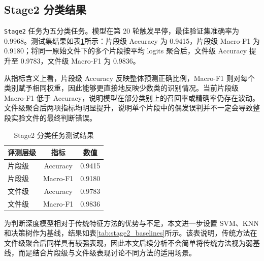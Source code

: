 \subsection{Stage2 分类结果}

\texttt{Stage2} 任务为五分类任务。模型在第 20 轮触发早停，最佳验证集准确率为 0.9968。测试集结果如表\ref{tab:stage2_results}所示：片段级 Accuracy 为 0.9415，片段级 Macro-F1 为 0.9180；将同一原始文件下的多个片段按平均 logits 聚合后，文件级 Accuracy 提升至 0.9783，文件级 Macro-F1 为 0.9836。

从指标含义上看，片段级 Accuracy 反映整体预测正确比例，Macro-F1 则对每个类别赋予相同权重，因此能够更直接地反映少数类的识别情况。当前片段级 Macro-F1 低于 Accuracy，说明模型在部分类别上的召回率或精确率仍存在波动。文件级聚合后两项指标均明显提升，说明单个片段中的偶发误判并不一定会导致整段实验文件的最终判断错误。

\begin{table}[!htbp]
  \centering
  \caption{Stage2 分类任务测试结果}
  \label{tab:stage2_results}
  \vspace{0.5em}
  \wuhao
  \begin{tabular}{lcc}
    \toprule
    评测层级 & 指标 & 数值 \\
    \midrule
    片段级 & Accuracy & 0.9415 \\
    片段级 & Macro-F1 & 0.9180 \\
    文件级 & Accuracy & 0.9783 \\
    文件级 & Macro-F1 & 0.9836 \\
    \bottomrule
  \end{tabular}
\end{table}

为判断深度模型相对于传统特征方法的优势与不足，本文进一步设置 SVM、KNN 和决策树作为基线，结果如表\ref{tab:stage2_baselines}所示。该表说明，传统方法在文件级聚合后同样具有较强表现，因此本文后续分析不会简单将传统方法视为弱基线，而是结合片段级与文件级表现讨论不同方法的适用场景。

\begin{table}[!htbp]
  \centering
  \caption{Stage2 分类任务传统基线对比}
  \label{tab:stage2_baselines}
  \vspace{0.5em}
  \wuhao
\end{table}

